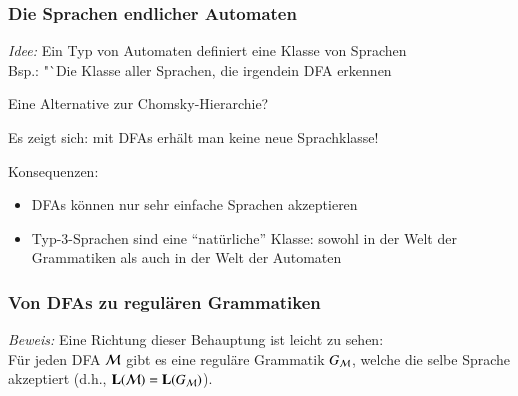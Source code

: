 \documentclass[onlymath]{beamer}
\begin{document}
\begin{frame}

\end{frame}

\begin{frame}\frametitle{Die Sprachen endlicher Automaten}

\emph{Idee:} Ein Typ von Automaten definiert eine Klasse von Sprachen\\
Bsp.: "`Die Klasse aller Sprachen, die irgendein DFA erkennen 
\bigskip

\alert{Eine Alternative zur Chomsky-Hierarchie?}
\smallskip\pause

Es zeigt sich: mit DFAs erhält man keine neue Sprachklasse!
\medskip


Konsequenzen:
\begin{itemize}
\item DFAs können nur sehr einfache Sprachen akzeptieren
\item Typ-3-Sprachen sind eine "`natürliche"' Klasse: sowohl in der Welt der Grammatiken als auch in der Welt der Automaten
\end{itemize}



\end{frame}

\begin{frame}\frametitle{Von DFAs zu regulären Grammatiken}


\emph{Beweis:} Eine Richtung dieser Behauptung ist leicht zu sehen:\\[0.5ex]
Für jeden DFA $\mathcal{M}$ gibt es eine reguläre Grammatik $G_{\mathcal{M}}$, welche die selbe Sprache akzeptiert (d.h., $\textbf{\textcolor{black}{L}}(\mathcal{M})=\textbf{\textcolor{black}{L}}(G_{\mathcal{M}})$).\smallskip\pause


\end{frame}
\end{document}
